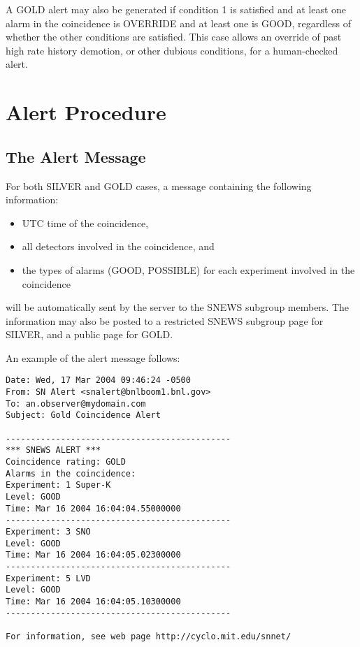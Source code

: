 \documentclass{article}
\begin{document}
A GOLD alert may also be generated if condition 1 is satisfied and
at least one alarm in the coincidence is OVERRIDE and at least one
is GOOD, regardless of whether the other conditions
are satisfied. This case allows an override of past high rate history
demotion, or other dubious conditions,  for a human-checked alert.

\section{Alert Procedure}

\subsection{The Alert Message}

For both SILVER and GOLD cases, a message containing the following
information:

\begin{itemize}
\item UTC time of the coincidence,
\item all detectors involved in the coincidence, and
\item the types of alarms (GOOD, POSSIBLE) for each experiment involved
in the coincidence
\end{itemize}

will be automatically sent by the server to the SNEWS subgroup
members.   The information may also be posted to a restricted SNEWS
subgroup page for SILVER, and a public page for GOLD.

An example of the alert message follows:

\begin{verbatim}
Date: Wed, 17 Mar 2004 09:46:24 -0500
From: SN Alert <snalert@bnlboom1.bnl.gov>
To: an.observer@mydomain.com
Subject: Gold Coincidence Alert

---------------------------------------------
*** SNEWS ALERT ***
Coincidence rating: GOLD
Alarms in the coincidence:
Experiment: 1 Super-K
Level: GOOD
Time: Mar 16 2004 16:04:04.55000000
---------------------------------------------
Experiment: 3 SNO
Level: GOOD 
Time: Mar 16 2004 16:04:05.02300000
---------------------------------------------
Experiment: 5 LVD
Level: GOOD 
Time: Mar 16 2004 16:04:05.10300000
---------------------------------------------

For information, see web page http://cyclo.mit.edu/snnet/

\end{verbatim}
\end{document}
